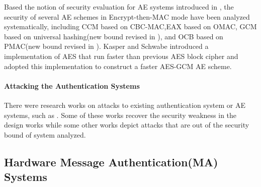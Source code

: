 \documentclass{article}
\begin{document}
Based the notion of security evaluation for AE systems introduced in \cite{aead}, the security of several AE schemes in
Encrypt-then-MAC mode have been analyzed systematically, including CCM \cite{ccm}based on
CBC-MAC,EAX\cite{eax} based on OMAC, GCM
\cite{gcm} based on universal hashing(new bound revised in \cite{breaking}), and
OCB\cite{ocb} based on PMAC(new bound revised in \cite{tweak,iPMAC}). Kasper and
Schwabe introduced a implementation of AES that run faster than previous AES block cipher
and adopted this implementation to construct a faster AES-GCM AE
scheme\cite{fast}.
\paragraph{Attacking the Authentication Systems}
There were research works on attacks to existing authentication system or AE systems, such as
\cite{cycle,attack_blk,hardware_attack}. Some of these works recover the security weakness in the design works while some other works depict attacks that are out of the security bound of system analyzed. 

\subsection{Hardware Message Authentication(MA) Systems}
\end{document}
